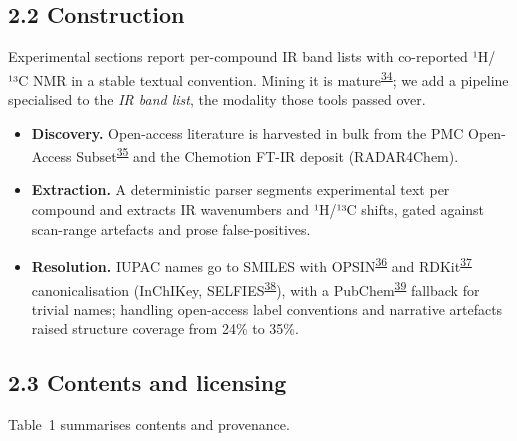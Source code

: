\documentclass[
  10pt,
]{article}
\providecommand{\tightlist}{%
  \setlength{\itemsep}{0pt}\setlength{\parskip}{0pt}}
\begin{document}
\hypertarget{construction}{%
\subsection{2.2 Construction}\label{construction}}

Experimental sections report per-compound IR band lists with co-reported
¹H/¹³C NMR in a stable textual convention. Mining it is
mature\textsuperscript{\protect\hyperlink{ref-swain2016chemdataextractor}{34}};
we add a pipeline specialised to the \emph{IR band list}, the modality
those tools passed over.

\begin{itemize}
\tightlist
\item
  \textbf{Discovery.} Open-access literature is harvested in bulk from
  the PMC Open-Access
  Subset\textsuperscript{\protect\hyperlink{ref-pmc_oa}{35}} and the
  Chemotion FT-IR deposit (RADAR4Chem).
\item
  \textbf{Extraction.} A deterministic parser segments experimental text
  per compound and extracts IR wavenumbers and ¹H/¹³C shifts, gated
  against scan-range artefacts and prose false-positives.
\item
  \textbf{Resolution.} IUPAC names go to SMILES with
  OPSIN\textsuperscript{\protect\hyperlink{ref-lowe2011opsin}{36}} and
  RDKit\textsuperscript{\protect\hyperlink{ref-landrum_rdkit}{37}}
  canonicalisation (InChIKey,
  SELFIES\textsuperscript{\protect\hyperlink{ref-krenn2020selfies}{38}}),
  with a
  PubChem\textsuperscript{\protect\hyperlink{ref-kim2023pubchem}{39}}
  fallback for trivial names; handling open-access label conventions and
  narrative artefacts raised structure coverage from 24\% to 35\%.
\end{itemize}

\hypertarget{contents-and-licensing}{%
\subsection{2.3 Contents and licensing}\label{contents-and-licensing}}

Table~1 summarises contents and provenance.
\end{document}
